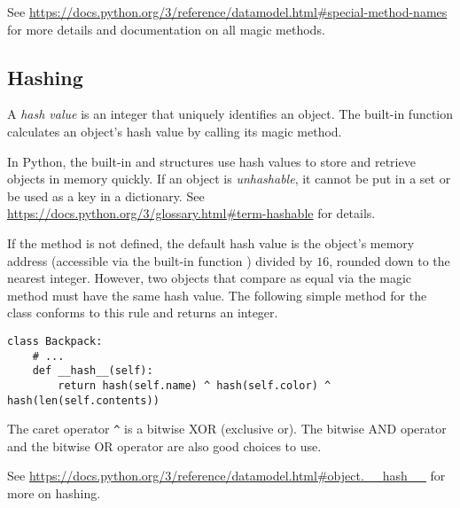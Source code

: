 See \url{https://docs.python.org/3/reference/datamodel.html\#special-method-names} for more details and documentation on all magic methods.

\subsection*{Hashing} %

A \emph{hash value} is an integer that uniquely identifies an object.
The built-in  function calculates an object's hash value by calling its  magic method.
%

In Python, the built-in  and  structures use hash values to store and retrieve objects in memory quickly.
If an object is \emph{unhashable}, it cannot be put in a set or be used as a key in a dictionary.
See \url{https://docs.python.org/3/glossary.html\#term-hashable} for details.

If the  method is not defined, the default hash value is the object's memory address (accessible via the built-in function ) divided by $16$, rounded down to the nearest integer.
However, two objects that compare as equal via the  magic method must have the same hash value.
The following simple  method for the  class conforms to this rule and returns an integer.

\begin{lstlisting}
class Backpack:
    # ...
    def __hash__(self):
        return hash(self.name) ^ hash(self.color) ^ hash(len(self.contents))
\end{lstlisting}

The caret operator \texttt{\^} is a bitwise XOR (exclusive or).
The bitwise AND operator \li{&} and the bitwise OR operator \li{|} are also good choices to use.

See \url{https://docs.python.org/3/reference/datamodel.html\#object.__hash__} for more on hashing.

